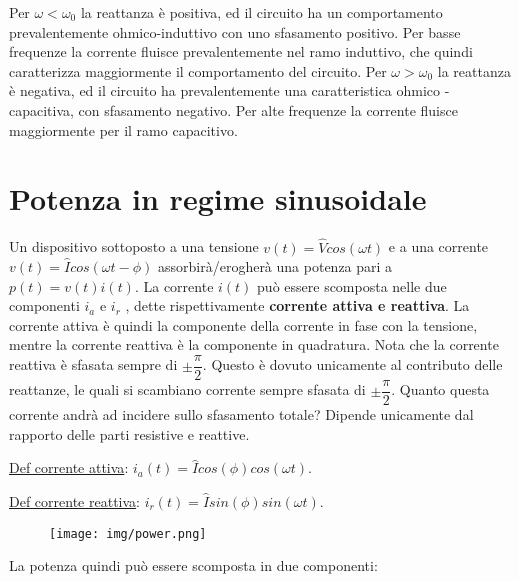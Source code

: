 \documentclass{article}
\begin{document}
\noindent Per $\omega < \omega_0$ la reattanza è positiva, ed il circuito ha un comportamento prevalentemente ohmico-induttivo con
 uno sfasamento positivo. Per basse frequenze la corrente fluisce prevalentemente nel ramo induttivo, che quindi caratterizza 
 maggiormente il comportamento del circuito. Per $\omega > \omega_0$ la reattanza è negativa, ed il circuito ha
prevalentemente una caratteristica ohmico - capacitiva, con sfasamento negativo. Per alte frequenze la
corrente fluisce maggiormente per il ramo capacitivo.
\pagebreak
 
\section{Potenza in regime sinusoidale}
\noindent Un dispositivo sottoposto a una tensione $v(t)=\hat{V}cos(\omega t)$ e a una corrente $v(t)=\hat{I}cos(\omega t-\phi)$
assorbirà/erogherà una potenza pari a $p(t)=v(t)i(t)$. La corrente $i(t)$ può essere scomposta nelle due componenti $i_a$ e $i_r$ , 
dette rispettivamente \textbf{corrente attiva e reattiva}. La corrente attiva è quindi la componente della corrente in fase con la 
tensione, mentre la corrente reattiva è la componente in quadratura. Nota che la corrente reattiva è sfasata sempre di 
$\pm \dfrac{\pi}{2}$. Questo è dovuto unicamente al contributo delle reattanze, le quali si scambiano corrente sempre sfasata di 
$\pm \dfrac{\pi}{2}$. Quanto questa corrente andrà ad incidere sullo sfasamento totale? Dipende unicamente dal rapporto delle parti 
resistive e reattive. 

\noindent \underline{Def corrente attiva}: $i_a(t)=\hat{I}cos(\phi)cos(\omega t)$.

\noindent \underline{Def corrente reattiva}: $i_r(t)=\hat{I}sin(\phi)sin(\omega t)$.

\begin{figure}[h!]
    \begin{center}
        \texttt{[image: img/power.png]}
    \end{center}
\end{figure}

\noindent La potenza quindi può essere scomposta in due componenti:

\medskip
\noindent{}
\medskip
\end{document}
